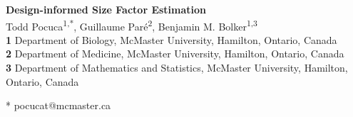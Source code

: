 \documentclass[10pt,letterpaper]{article}
\begin{document}
\vspace*{0.2in}

\begin{flushleft}
{\Large
\textbf{Design-informed Size Factor Estimation} %
}
\newline
\\
Todd Pocuca\textsuperscript{1,*}, 
Guillaume Paré\textsuperscript{2}, 
Benjamin M. Bolker\textsuperscript{1,3}
\\
\bigskip
\textbf{1} Department of Biology, McMaster University, Hamilton, Ontario, Canada
\\
\textbf{2} Department of Medicine, McMaster University, Hamilton, Ontario, Canada
\\
\textbf{3} Department of Mathematics and Statistics, McMaster University, Hamilton, Ontario, Canada
\\
\bigskip

% 
%





* pocucat@mcmaster.ca

\end{flushleft}

\end{document}
